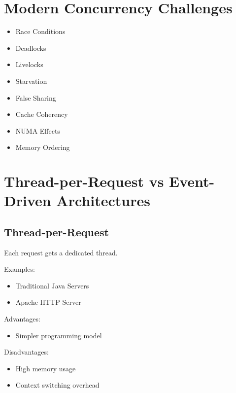 \section{Modern Concurrency Challenges}

\begin{itemize}
\item Race Conditions
\item Deadlocks
\item Livelocks
\item Starvation
\item False Sharing
\item Cache Coherency
\item NUMA Effects
\item Memory Ordering
\end{itemize}

\section{Thread-per-Request vs Event-Driven Architectures}

\subsection{Thread-per-Request}

Each request gets a dedicated thread.

Examples:

\begin{itemize}
\item Traditional Java Servers
\item Apache HTTP Server
\end{itemize}

Advantages:

\begin{itemize}
\item Simpler programming model
\end{itemize}

Disadvantages:

\begin{itemize}
\item High memory usage
\item Context switching overhead
\end{itemize}

